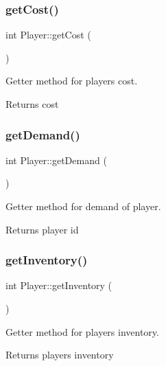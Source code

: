 \subsubsection{\texorpdfstring{get\+Cost()}{getCost()}}
{\footnotesize\ttfamily int Player\+::get\+Cost (\begin{DoxyParamCaption}{ }\end{DoxyParamCaption})}



Getter method for player\textquotesingle{}s cost. 

\begin{DoxyReturn}{Returns}
cost 
\end{DoxyReturn}
\mbox{\label{class_player_a8bfca991628b682ff9cae6d05ee9131c}} 
\subsubsection{\texorpdfstring{get\+Demand()}{getDemand()}}
{\footnotesize\ttfamily int Player\+::get\+Demand (\begin{DoxyParamCaption}{ }\end{DoxyParamCaption})}



Getter method for demand of player. 

\begin{DoxyReturn}{Returns}
player id 
\end{DoxyReturn}
\mbox{\label{class_player_ae21d65a545c20c70ac7a53389b223ce6}} 
\subsubsection{\texorpdfstring{get\+Inventory()}{getInventory()}}
{\footnotesize\ttfamily int Player\+::get\+Inventory (\begin{DoxyParamCaption}{ }\end{DoxyParamCaption})}



Getter method for player\textquotesingle{}s inventory. 

\begin{DoxyReturn}{Returns}
player\textquotesingle{}s inventory 
\end{DoxyReturn}
\mbox{\label{class_player_af838b44639ee94d4185917d5d2259ce2}} 
